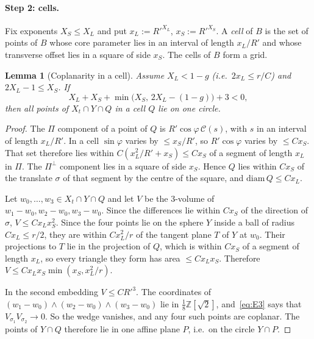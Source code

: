 \documentclass[aps,prx,twocolumn,superscriptaddress,nofootinbib,longbibliography]{revtex4-2}
\theoremstyle{plain}
\newtheorem{lemma}{Lemma}
\theoremstyle{definition}
\theoremstyle{remark}
\newcommand{\Z}{\mathbb{Z}}
\begin{document}
\paragraph{Step 2: cells.} Fix exponents $X_S\le X_L$ and put $x_L:=R'^{X_L}$, $x_S:=R'^{X_S}$. A \emph{cell} of $B$ is the set of points of $B$ whose core parameter lies in an interval of length $x_L/R'$ and whose transverse offset lies in a square of side $x_S$. The cells of $B$ form a grid.

\begin{lemma}[Coplanarity in a cell]\label{lem:E3}
Assume $X_L<1-g$ (i.e.\ $2x_L\le r/C$) and $2X_L-1\le X_S$. If
\begin{equation}\label{eq:E3}
X_L+X_S+\min\big(X_S,\,2X_L-(1-g)\big)+3<0,
\end{equation}
then all points of $X_t\cap Y\cap Q$ in a cell $Q$ lie on one circle.
\end{lemma}
\begin{proof}
The $\Pi$ component of a point of $Q$ is $R'\cos\varphi\,\mathcal C(s)$, with $s$ in an interval of length $x_L/R'$. In a cell $\sin\varphi$ varies by $\le x_S/R'$, so $R'\cos\varphi$ varies by $\le Cx_S$. That set therefore lies within $C(x_L^2/R'+x_S)\le Cx_S$ of a segment of length $x_L$ in $\Pi$. The $\Pi^\perp$ component lies in a square of side $x_S$. Hence $Q$ lies within $Cx_S$ of the translate $\sigma$ of that segment by the centre of the square, and $\mathrm{diam}\,Q\le Cx_L$.

Let $w_0,\dots,w_3\in X_t\cap Y\cap Q$ and let $V$ be the $3$-volume of $w_1-w_0,w_2-w_0,w_3-w_0$. Since the differences lie within $Cx_S$ of the direction of $\sigma$, $V\le Cx_Lx_S^2$. Since the four points lie on the sphere $Y$ inside a ball of radius $Cx_L\le r/2$, they are within $Cx_L^2/r$ of the tangent plane $T$ of $Y$ at $w_0$. Their projections to $T$ lie in the projection of $Q$, which is within $Cx_S$ of a segment of length $x_L$, so every triangle they form has area $\le Cx_Lx_S$. Therefore $V\le Cx_Lx_S\min(x_S,x_L^2/r)$.

In the second embedding $V\le CR'^3$. The coordinates of $(w_1-w_0)\wedge(w_2-w_0)\wedge(w_3-w_0)$ lie in $\tfrac18\Z[\sqrt2]$, and~\eqref{eq:E3} says that $V_{\sigma_1}V_{\sigma_2}\to0$. So the wedge vanishes, and any four such points are coplanar. The points of $Y\cap Q$ therefore lie in one affine plane $P$, i.e.\ on the circle $Y\cap P$.
\end{proof}
\end{document}
